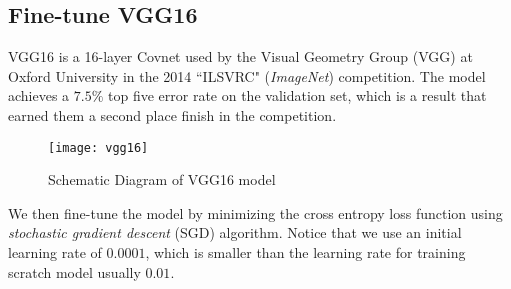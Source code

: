 \subsection{Fine-tune VGG16} 
\label{subsec:vgg16}
VGG16 is a 16-layer Covnet used by the Visual Geometry Group (VGG) at Oxford 
University in the 2014 ``ILSVRC" (\emph{ImageNet}) competition. 
The model achieves a $7.5\%$ top five error rate on the validation set, which 
is a result that earned them a second place finish in the competition.
%
\begin{figure}[htb]
\centering
\texttt{[image: vgg16]}
\caption{Schematic Diagram of VGG16 model}
\label{fig:vgg16schema}
\end{figure}
%
%


%
%
We then fine-tune the model by minimizing the cross entropy loss function using
\emph{stochastic gradient descent} (SGD) algorithm. 
Notice that we use an initial learning 
rate of $0.0001$, which is smaller than the learning rate for training scratch 
model usually $0.01$.




